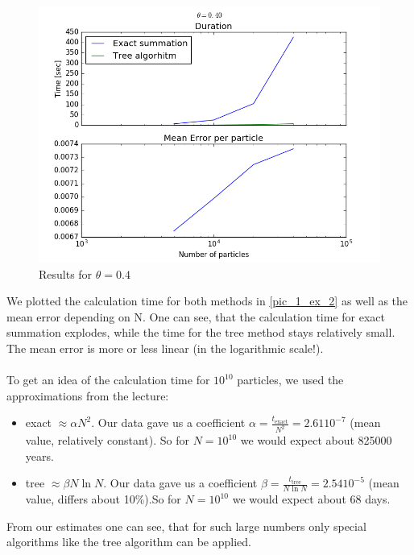 \documentclass{scrartcl}
\begin{document}
	\begin{figure}
		\centering
		\includegraphics[width = \textwidth]{eval_th_4}
		\caption{Results for $\theta = 0.4$}
		\label{pic_1_ex_2}
	\end{figure}
	
	We plotted the calculation time for both methods in \autoref{pic_1_ex_2} as well as the mean error depending on N. One can see, that the calculation time for exact summation explodes, while the time for the tree method stays relatively small. The mean error is more or less linear (in the logarithmic scale!).\\
	\\
	To get an idea of the calculation time for $10^{10}$ particles, we used the approximations from the lecture:
	\begin{itemize}
		\item exact $\approx \alpha N^2$. Our data gave us a coefficient $\alpha = \frac{t_\text{exact}}{N^2} = 2.61 10^{-7}$ (mean value, relatively constant). So for $N = 10 ^{10}$ we would expect about 825000 years.
		\item tree $\approx \beta N \ln N$. Our data gave us a coefficient $\beta = \frac{t_\text{tree}}{N \ln N} =2.54 10^{-5}$ (mean value, differs about 10\%).So for $N = 10 ^{10}$ we would expect about 68 days.
	\end{itemize}
	From our estimates one can see, that for such large numbers only special algorithms like the tree algorithm can be applied. 
	
	
	
\end{document}
